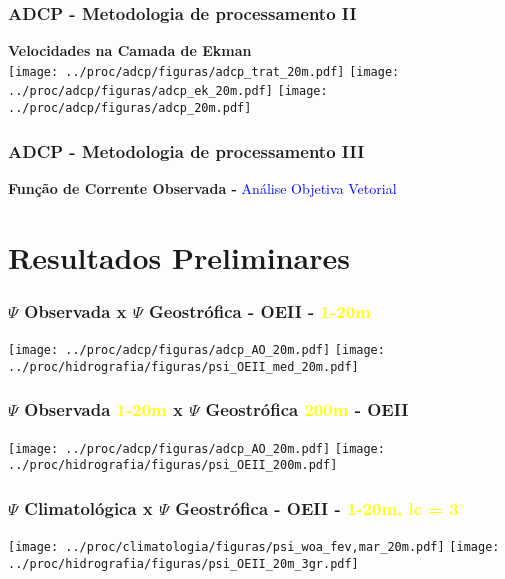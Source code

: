 \documentclass[pdftex]{beamer}
\begin{document}
\frame
{
  \frametitle{ADCP - Metodologia de processamento II}
\begin{center}
{\bf Velocidades na Camada de Ekman}\\
\vspace{1cm}
\texttt{[image: ../proc/adcp/figuras/adcp\_trat\_20m.pdf]}
\texttt{[image: ../proc/adcp/figuras/adcp\_ek\_20m.pdf]}
\texttt{[image: ../proc/adcp/figuras/adcp\_20m.pdf]}
\end{center}
}

\frame
{
  \frametitle{ADCP - Metodologia de processamento III}
\begin{center}
{\bf Função de Corrente Observada - }\textcolor{blue}{Análise Objetiva Vetorial}
\end{center}
}


\section[Resultados]{Resultados Preliminares}



\frame
{
  \frametitle{$\Psi$ Observada x $\Psi$ Geostrófica - OEII - \textcolor{yellow}{1-20m}}

\begin{center}
\texttt{[image: ../proc/adcp/figuras/adcp\_AO\_20m.pdf]}
\texttt{[image: ../proc/hidrografia/figuras/psi\_OEII\_med\_20m.pdf]}
\end{center}
}


\frame
{
  \frametitle{$\Psi$ Observada \textcolor{yellow}{1-20m} x $\Psi$ Geostrófica \textcolor{yellow}{200m} - OEII}

\begin{center}
\texttt{[image: ../proc/adcp/figuras/adcp\_AO\_20m.pdf]}
\texttt{[image: ../proc/hidrografia/figuras/psi\_OEII\_200m.pdf]}
\end{center}
}

\frame
{
  \frametitle{$\Psi$ Climatológica x $\Psi$ Geostrófica - OEII - \textcolor{yellow}{1-20m, lc = 3$^\circ$}}

\begin{center}
\texttt{[image: ../proc/climatologia/figuras/psi\_woa\_fev,mar\_20m.pdf]}
\texttt{[image: ../proc/hidrografia/figuras/psi\_OEII\_20m\_3gr.pdf]}
\end{center}
}
\end{document}
